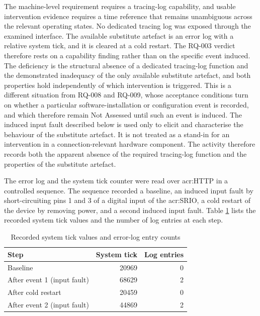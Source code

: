 The machine-level requirement requires a tracing-log capability, and usable intervention evidence requires a time reference that remains unambiguous across the relevant operating states. No dedicated tracing log was exposed through the examined interface. The available substitute artefact is an error log with a relative system tick, and it is cleared at a cold restart. The RQ-003 verdict therefore rests on a capability finding rather than on the specific event induced. The deficiency is the structural absence of a dedicated tracing-log function and the demonstrated inadequacy of the only available substitute artefact, and both properties hold independently of which intervention is triggered. This is a different situation from RQ-008 and RQ-009, whose acceptance conditions turn on whether a particular software-installation or configuration event is recorded, and which therefore remain Not Assessed until such an event is induced. The induced input fault described below is used only to elicit and characterise the behaviour of the substitute artefact. It is not treated as a stand-in for an intervention in a connection-relevant hardware component. The activity therefore records both the apparent absence of the required tracing-log function and the properties of the substitute artefact.

The error log and the system tick counter were read over \gls{acr:HTTP} in a controlled sequence. The sequence recorded a baseline, an induced input fault by short-circuiting pins 1 and 3 of a digital input of the \gls{acr:SRIO}, a cold restart of the device by removing power, and a second induced input fault. Table \ref{tab:rq003_evidence} lists the recorded system tick values and the number of log entries at each step.

\begin{table}[H]
	\centering
	\small
	\caption{Recorded system tick values and error-log entry counts}
	\label{tab:rq003_evidence}
	\begin{tabular}{l r r}
		\toprule
		\textbf{Step} & \textbf{System tick} & \textbf{Log entries} \\
		\midrule
		Baseline & 20969 & 0 \\
		After event 1 (input fault) & 68629 & 2 \\
		After cold restart & 20459 & 0 \\
		After event 2 (input fault) & 44869 & 2 \\
		\bottomrule
	\end{tabular}
\end{table}


